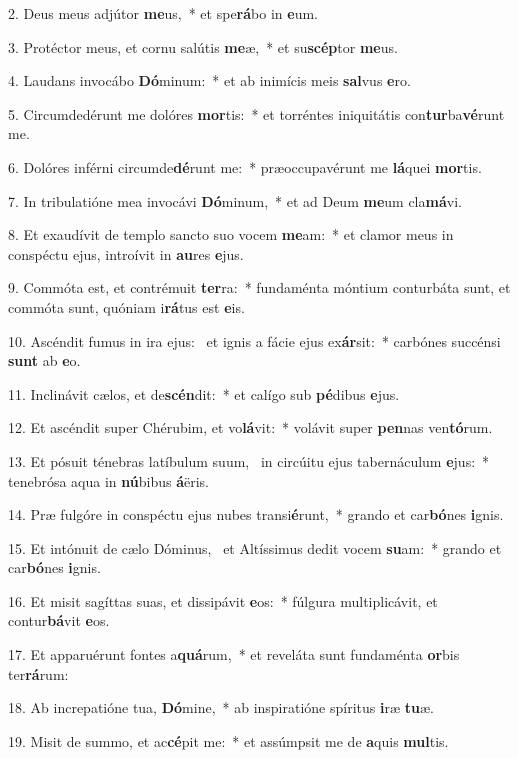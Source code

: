 2. Deus meus adjútor \textbf{me}us,~*  et spe\textbf{rá}bo in \textbf{e}um.\

3. Protéctor meus, et cornu salútis \textbf{me}æ,~*  et su\textbf{scép}tor \textbf{me}us.\

4. Laudans invocábo \textbf{Dó}minum:~*  et ab inimícis meis \textbf{sal}vus \textbf{e}ro.\

5. Circumdedérunt me dolóres \textbf{mor}tis:~*  et torréntes iniquitátis con\textbf{tur}ba\textbf{vé}runt me.\

6. Dolóres inférni circumde\textbf{dé}runt me:~*  præoccupavérunt me \textbf{lá}quei \textbf{mor}tis.\

7. In tribulatióne mea invocávi \textbf{Dó}minum,~*  et ad Deum \textbf{me}um cla\textbf{má}vi.\

8. Et exaudívit de templo sancto suo vocem \textbf{me}am:~*  et clamor meus in conspéctu ejus, introívit in \textbf{au}res \textbf{e}jus.\

9. Commóta est, et contrémuit \textbf{ter}ra:~*  fundaménta móntium conturbáta sunt, et commóta sunt, quóniam i\textbf{rá}tus est \textbf{e}is.\

10. Ascéndit fumus in ira ejus: \dag\  et ignis a fácie ejus ex\textbf{ár}sit:~*  carbónes succénsi \textbf{sunt} ab \textbf{e}o.\

11. Inclinávit cælos, et de\textbf{scén}dit:~*  et calígo sub \textbf{pé}dibus \textbf{e}jus.\

12. Et ascéndit super Chérubim, et vo\textbf{lá}vit:~*  volávit super \textbf{pen}nas ven\textbf{tó}rum.\

13. Et pósuit ténebras latíbulum suum, \dag\  in circúitu ejus tabernáculum \textbf{e}jus:~*  tenebrósa aqua in \textbf{nú}bibus \textbf{á}ëris.\

14. Præ fulgóre in conspéctu ejus nubes transi\textbf{é}runt,~*  grando et car\textbf{bó}nes \textbf{i}gnis.\

15. Et intónuit de cælo Dóminus, \dag\  et Altíssimus dedit vocem \textbf{su}am:~*  grando et car\textbf{bó}nes \textbf{i}gnis.\

16. Et misit sagíttas suas, et dissipávit \textbf{e}os:~*  fúlgura multiplicávit, et contur\textbf{bá}vit \textbf{e}os.\

17. Et apparuérunt fontes a\textbf{quá}rum,~*  et reveláta sunt fundaménta \textbf{or}bis ter\textbf{rá}rum:\

18. Ab increpatióne tua, \textbf{Dó}mine,~*  ab inspiratióne spíritus \textbf{i}ræ \textbf{tu}æ.\

19. Misit de summo, et ac\textbf{cé}pit me:~*  et assúmpsit me de \textbf{a}quis \textbf{mul}tis.\

